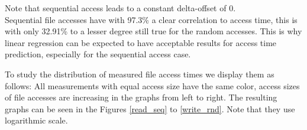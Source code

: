 \documentclass{superfri}
\begin{document}
	Note that sequential access leads to a constant delta-offset of $0$.\\
	Sequential file accesses have with 97.3\% a clear correlation to access time, this is with only 32.91\% to a lesser degree still true for the random accesses.
	This is why linear regression can be expected to have acceptable results for access time prediction, especially for the sequential access case.
	
	
	\medskip
	
	To study the distribution of measured file access times we display them as follows:
	All measurements with equal access size have the same color, access sizes of file accesses are increasing in the graphs from left to right.
	The resulting graphs can be seen in the Figures \ref{read_seq} to \ref{write_rnd}. Note that they use logarithmic scale.
	
\end{document}
